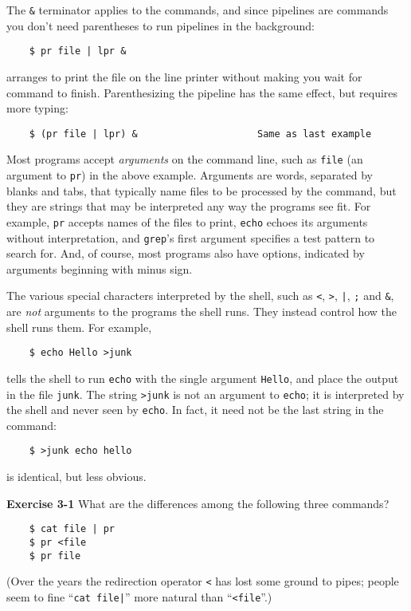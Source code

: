     The \verb=&= terminator applies to the commands, and since pipelines are commands
you don't need parentheses to run pipelines in the background:
\begin{verbatim}
    $ pr file | lpr &
\end{verbatim}
arranges to print the file on the line printer without making you wait for
command to finish. Parenthesizing the pipeline has the same effect, but
requires more typing:
\begin{verbatim}
    $ (pr file | lpr) &                     Same as last example
\end{verbatim}

    Most programs accept \textit{arguments} on the command line, such as \verb=file= (an
argument to \verb=pr=) in the above example. Arguments are words, separated by
blanks and tabs, that typically name files to be processed by the command, but
they are strings that may be interpreted any way the programs see fit. For
example, \texttt{pr} accepts names of the files to print, \verb=echo= echoes its arguments without
interpretation, and \verb=grep='s first argument specifies a test pattern to search for.
And, of course, most programs also have options, indicated by arguments
beginning with minus sign.

    The various special characters interpreted by the shell, such as \verb=<=, \verb=>=, \verb=|=, \verb=;=
and \verb=&=, are \textit{not} arguments to the programs the shell runs. They instead control
how the shell runs them. For example,
\begin{verbatim}
    $ echo Hello >junk
\end{verbatim}
tells the shell to run \verb=echo= with the single argument \verb=Hello=, and place the output
in the file \verb=junk=. The string \verb=>junk= is not an argument to \verb=echo=; it is
interpreted by the shell and never seen by \verb=echo=. In fact, it need not be the
last string in the command:
\begin{verbatim}
    $ >junk echo hello
\end{verbatim}
is identical, but less obvious.


\textbf{Exercise 3-1} What are the differences among the following three commands?
\begin{verbatim}
    $ cat file | pr
    $ pr <file
    $ pr file
\end{verbatim}
(Over the years the redirection operator \verb=<= has lost some ground to pipes; people seem to
fine ``\verb=cat file|='' more natural than ``\verb=<file=''.)


